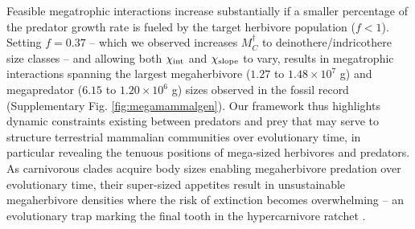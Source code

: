 \documentclass[11pt]{article}
\begin{document}
Feasible megatrophic interactions increase substantially if a smaller percentage of the predator growth rate is fueled by the target herbivore population ($f<1$).
Setting $f=0.37$ -- which we observed increases $M_C^\dagger$ to deinothere/indricothere size classes -- and allowing both $\chi_{\rm int}$ and $\chi_{\rm slope}$ to vary, results in megatrophic interactions spanning the largest megaherbivore ($1.27$ to $1.48\times10^7$ g) and megapredator ($6.15$ to $1.20\times10^6$ g) sizes observed in the fossil record (Supplementary Fig. \ref{fig:megamammalgen}).
Our framework thus highlights dynamic constraints existing between predators and prey that may serve to structure terrestrial mammalian communities over evolutionary time, in particular revealing the tenuous positions of mega-sized herbivores and predators.
As carnivorous clades acquire body sizes enabling megaherbivore predation over evolutionary time, their super-sized appetites result in unsustainable megaherbivore densities where the risk of extinction becomes overwhelming -- an evolutionary trap marking the final tooth in the hypercarnivore ratchet \citep[cf.][]{VanValkenburgh:2004p2451}.

\end{document}
